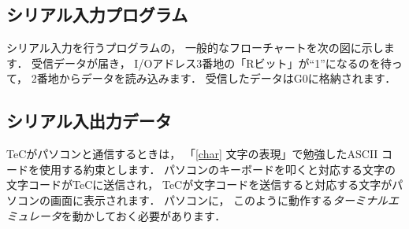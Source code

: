 \subsection{シリアル入力プログラム}
シリアル入力を行うプログラムの，
一般的なフローチャートを次の図に示します．
受信データが届き，
I/Oアドレス3番地の「Rビット」が``1''になるのを待って，
2番地からデータを読み込みます．
受信したデータはG0に格納されます．

\begin{center}
\end{center}

\subsection{シリアル入出力データ}
TeCがパソコンと通信するときは，
「\ref{char} 文字の表現」で勉強したASCII コードを使用する約束とします．
パソコンのキーボードを叩くと対応する文字の文字コードがTeCに送信され，
TeCが文字コードを送信すると対応する文字がパソコンの画面に表示されます．
パソコンに，
このように動作する\emph{ターミナルエミュレータ}を動かしておく必要があります．

